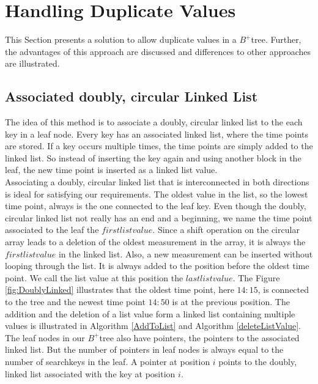 \documentclass[abstracton,12pt]{scrreprt}
\begin{document}
\section{Handling Duplicate Values}
\label{sec:allowDV}
This Section presents a solution to allow duplicate values in a $B^+$tree. Further, the advantages of this approach are discussed and differences to other approaches are illustrated. 

\subsection{Associated doubly, circular Linked List}
\label{doublyLinked}
The idea of this method is to associate a doubly, circular linked list to the each key in a leaf node. Every key has an associated linked list, where the time points are stored. If a key occurs multiple times, the time points are simply added to the linked list. So instead of inserting the key again and using another block in the leaf, the new time point is inserted as a linked list value.\\ 
Associating a doubly, circular linked list that is interconnected in both directions is ideal for satisfying our requirements. The oldest value in the list, so the lowest time point, always is the one connected to the leaf key. Even though the doubly, circular linked list not really has an end and a beginning, we name the time point associated to the leaf the $first list value$. Since a shift operation on the circular array leads to a deletion of the oldest measurement in the array, it is always the $first list value$ in the linked list. Also, a new measurement can be inserted without looping through the list. It is always added to the position before the oldest time point. We call the list value at this position the $last list value$. The Figure \ref{fig:DoublyLinked} illustrates that the oldest time point, here $14:15$, is connected to the tree and the newest time point $14:50$ is at the previous position. The addition and the deletion of a list value form a linked list containing multiple values is illustrated in Algorithm \ref{AddToList} and Algorithm \ref{deleteListValue}.\\
The leaf nodes in our $B^+$tree also have pointers, the pointers to the associated linked list. But the number of pointers in leaf nodes is always equal to the number of searchkeys in the leaf. A pointer at position $i$ points to the doubly, linked list associated with the key at position $i$.\\
\end{document}
